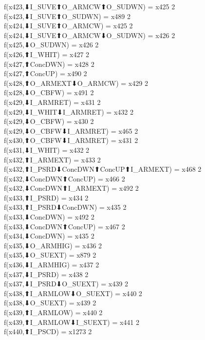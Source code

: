 f(x423,⬇I_SUVE⬆O_ARMCW⬆O_SUDWN) = x425 {2} \\
f(x423,⬇I_SUVE⬆O_SUDWN) = x489 {2} \\
f(x424,⬇I_SUVE⬆O_ARMCW) = x425 {2} \\
f(x424,⬇I_SUVE⬆O_ARMCW⬇O_SUDWN) = x426 {2} \\
f(x425,⬇O_SUDWN) = x426 {2} \\
f(x426,⬆I_WHIT) = x427 {2} \\
f(x427,⬆ConcDWN) = x428 {2} \\
f(x427,⬆ConcUP) = x490 {2} \\
f(x428,⬆O_ARMEXT⬇O_ARMCW) = x429 {2} \\
f(x428,⬇O_CBFW) = x491 {2} \\
f(x429,⬇I_ARMRET) = x431 {2} \\
f(x429,⬇I_WHIT⬇I_ARMRET) = x432 {2} \\
f(x429,⬇O_CBFW) = x430 {2} \\
f(x429,⬇O_CBFW⬇I_ARMRET) = x465 {2} \\
f(x430,⬆O_CBFW⬇I_ARMRET) = x431 {2} \\
f(x431,⬇I_WHIT) = x432 {2} \\
f(x432,⬆I_ARMEXT) = x433 {2} \\
f(x432,⬆I_PSRD⬇ConcDWN⬆ConcUP⬆I_ARMEXT) = x468 {2} \\
f(x432,⬇ConcDWN⬆ConcUP) = x466 {2} \\
f(x432,⬇ConcDWN⬆I_ARMEXT) = x492 {2} \\
f(x433,⬆I_PSRD) = x434 {2} \\
f(x433,⬆I_PSRD⬇ConcDWN) = x435 {2} \\
f(x433,⬇ConcDWN) = x492 {2} \\
f(x433,⬇ConcDWN⬆ConcUP) = x467 {2} \\
f(x434,⬇ConcDWN) = x435 {2} \\
f(x435,⬇O_ARMHIG) = x436 {2} \\
f(x435,⬇O_SUEXT) = x879 {2} \\
f(x436,⬇I_ARMHIG) = x437 {2} \\
f(x437,⬇I_PSRD) = x438 {2} \\
f(x437,⬇I_PSRD⬇O_SUEXT) = x439 {2} \\
f(x438,⬆I_ARMLOW⬇O_SUEXT) = x440 {2} \\
f(x438,⬇O_SUEXT) = x439 {2} \\
f(x439,⬆I_ARMLOW) = x440 {2} \\
f(x439,⬆I_ARMLOW⬇I_SUEXT) = x441 {2} \\
f(x440,⬆I_PSCD) = x1273 {2} \\
